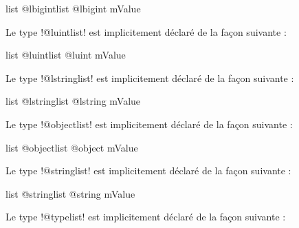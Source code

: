 \begin{galgas4box}
list @lbigintlist {
  @lbigint mValue
}
\end{galgas4box}











Le type \ggsq!@luintlist! est implicitement déclaré de la façon suivante :

\begin{galgas4box}
list @luintlist {
  @luint mValue
}
\end{galgas4box}











Le type \ggsq!@lstringlist! est implicitement déclaré de la façon suivante :

\begin{galgas4box}
list @lstringlist {
  @lstring mValue
}
\end{galgas4box}








Le type \ggsq!@objectlist! est implicitement déclaré de la façon suivante :

\begin{galgas4box}
list @objectlist {
  @object mValue
}
\end{galgas4box}






Le type \ggsq!@stringlist! est implicitement déclaré de la façon suivante :

\begin{galgas4box}
list @stringlist {
  @string mValue
}
\end{galgas4box}








Le type \ggsq!@typelist! est implicitement déclaré de la façon suivante :

